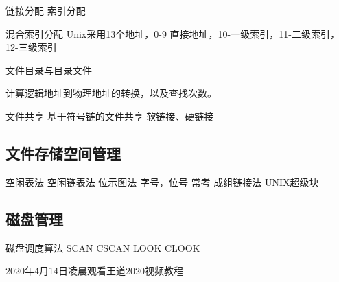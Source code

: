 链接分配
索引分配

混合索引分配
Unix采用13个地址，0-9 直接地址，10-一级索引，11-二级索引，12-三级索引 

文件目录与目录文件

计算逻辑地址到物理地址的转换，以及查找次数。

文件共享
基于符号链的文件共享
软链接、硬链接


\subsection{文件存储空间管理}

空闲表法
空闲链表法
位示图法 字号，位号  常考 
成组链接法 UNIX超级块 


\subsection{磁盘管理}

磁盘调度算法
SCAN
CSCAN
LOOK
CLOOK






2020年4月14日凌晨观看王道2020视频教程
